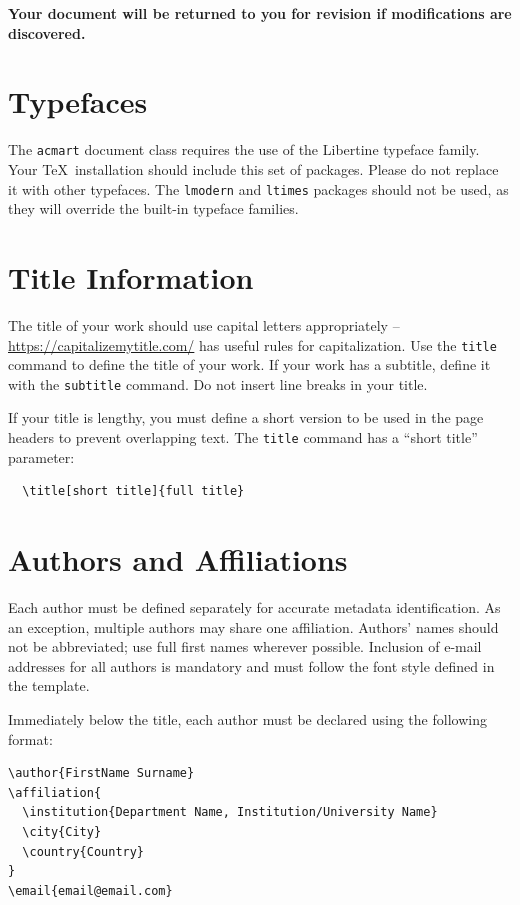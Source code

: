 \documentclass[sigconf]{acmart}
\begin{document}
\textbf{Your document will be returned to you for revision if modifications are discovered.}


\section{Typefaces}

The \verb|acmart| document class requires the use of the Libertine typeface family. Your \TeX\ installation should include this set of packages. Please do not replace it with other typefaces. The \verb|lmodern| and  \verb|ltimes| packages should not be used, as they will override the built-in typeface families.

\section{Title Information}

The title of your work should use capital letters appropriately --\url{https://capitalizemytitle.com/} has useful rules for capitalization. Use the {\verb|title|} command to define the title of your work. If your work has a subtitle, define it with the {\verb|subtitle|} command. Do not insert line breaks in your title.

If your title is lengthy, you must define a short version to be used in the page headers to prevent overlapping text. The \verb|title| command has a ``short title'' parameter:
\begin{verbatim}
  \title[short title]{full title}
\end{verbatim}

\section{Authors and Affiliations}

Each author must be defined separately for accurate metadata
identification. As an exception, multiple authors may share one
affiliation. Authors' names should not be abbreviated; use full first
names wherever possible. Inclusion of e-mail addresses for all authors is mandatory and must follow the font style defined in the template.

Immediately below the title, each author must be declared using the following format:

\begin{center}
\begin{minipage}{\columnwidth}
\small
\begin{verbatim}
\author{FirstName Surname}
\affiliation{
  \institution{Department Name, Institution/University Name}
  \city{City}
  \country{Country}
}
\email{email@email.com}
\end{verbatim}
\end{minipage}
\end{center}
\end{document}
